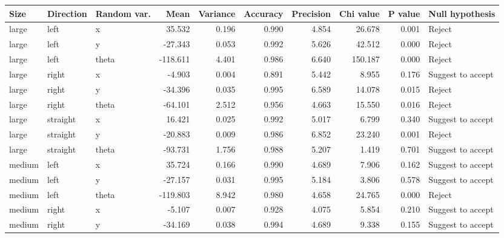     \begin{table}[]\footnotesize
    \begin{tabular}{@{}lllrrrrrrl@{}}
    \toprule
    Size   & Direction & Random var. & Mean     & Variance & Accuracy & Precision & Chi value & P value & Null hypothesis   \\ \midrule
    large  & left      & x               & 35.532   & 0.196    & 0.990    & 4.854     & 26.678    & 0.001   & Reject            \\
    large  & left      & y               & -27.343  & 0.053    & 0.992    & 5.626     & 42.512    & 0.000   & Reject            \\
    large  & left      & theta           & -118.611 & 4.401    & 0.986    & 6.640     & 150.187   & 0.000   & Reject            \\
    large  & right     & x               & -4.903   & 0.004    & 0.891    & 5.442     & 8.955     & 0.176   & Suggest to accept \\
    large  & right     & y               & -34.396  & 0.035    & 0.995    & 6.589     & 14.078    & 0.015   & Reject            \\
    large  & right     & theta           & -64.101  & 2.512    & 0.956    & 4.663     & 15.550    & 0.016   & Reject            \\
    large  & straight  & x               & 16.421   & 0.025    & 0.992    & 5.017     & 6.799     & 0.340   & Suggest to accept \\
    large  & straight  & y               & -20.883  & 0.009    & 0.986    & 6.852     & 23.240    & 0.001   & Reject            \\
    large  & straight  & theta           & -93.731  & 1.756    & 0.988    & 5.207     & 1.419     & 0.701   & Suggest to accept \\
    medium & left      & x               & 35.724   & 0.166    & 0.990    & 4.689     & 7.906     & 0.162   & Suggest to accept \\
    medium & left      & y               & -27.157  & 0.031    & 0.995    & 5.184     & 3.806     & 0.578   & Suggest to accept \\
    medium & left      & theta           & -119.803 & 8.942    & 0.980    & 4.658     & 24.765    & 0.000   & Reject            \\
    medium & right     & x               & -5.107   & 0.007    & 0.928    & 4.075     & 5.854     & 0.210   & Suggest to accept \\
    medium & right     & y               & -34.169  & 0.038    & 0.994    & 4.689     & 9.338     & 0.155   & Suggest to accept \\

\end{tabular}
\end{table}
